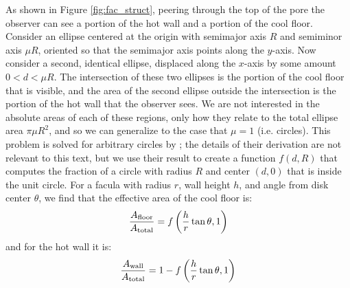 \documentclass[linenumbers,preprint,authoryear]{elsarticle}
\begin{document}
As shown in Figure \ref{fig:fac_struct}, peering through the top of the pore the observer can see a portion of the hot wall and a portion of the cool floor. Consider an ellipse centered at the origin with semimajor axis $R$ and semiminor axis $\mu R$, oriented so that the semimajor axis points along the $y$-axis. Now consider a second, identical ellipse, displaced along the $x$-axis by some amount $0<d<\mu R$. The intersection of these two ellipses is the portion of the cool floor that is visible, and the area of the second ellipse outside the intersection is the portion of the hot wall that the observer sees. We are not interested in the absolute areas of each of these regions, only how they relate to the total ellipse area $\pi \mu R^2$, and so we can generalize to the case that $\mu=1$ (i.e. circles). This problem is solved for arbitrary circles by \citet{weisstein2004}; the details of their derivation are not relevant to this text, but we use their result to create a function $f(d,R)$ that computes the fraction of a circle with radius $R$ and center $(d,0)$ that is inside the unit circle. For a facula with radius $r$, wall height $h$, and angle from disk center $\theta$, we find that the effective area of the cool floor is:
\begin{equation}
    \frac{A_{\rm floor}}{A_{\rm total}} = f\left(\frac{h}{r}\tan{\theta}, 1 \right)
\end{equation}
and for the hot wall it is:
\begin{equation}
    \frac{A_{\rm wall}}{A_{\rm total}} = 1-  f\left(\frac{h}{r}\tan{\theta}, 1 \right)
\end{equation}
\end{document}
